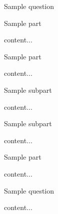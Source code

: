 \documentclass[11pt]{article} %
\begin{document}
	\renewcommand*{\qpoints}{10} %
	\renewcommand*{\coursecode}{MATH xxx} %
	\renewcommand*{\assgnnumber}{Assignment \#00} %
	\renewcommand*{\submdate}{00 MONTH 2019} %
	\renewcommand*{\studentfname}{FName} %
	\renewcommand*{\studentlname}{LName} %
	\renewcommand*{\studentnum}{SNumber} %
	\setfigpath
	\pagestyle{crowdmark}
	\fancyhfoffset[L,O]{0pt} %
\begin{qstn}[1] %
	Sample question
\begin{assgnenum}
	\qitem Sample part
	\begin{soln}
		content...
	\end{soln}
	\qitem Sample part
	\begin{soln}
		content...
	\end{soln}
	\begin{assgnenum}
		\qitem Sample subpart
		\begin{soln}
			content...
		\end{soln}
		\qitem Sample subpart
		\begin{soln}
			content...
		\end{soln}
	\end{assgnenum}
		\qitem Sample part
	\begin{soln}
		content...
	\end{soln}
\end{assgnenum}
\end{qstn}

\begin{qstn}[2]
	Sample question
\begin{soln}
	content...
\end{soln}
\end{qstn}
\end{document}
